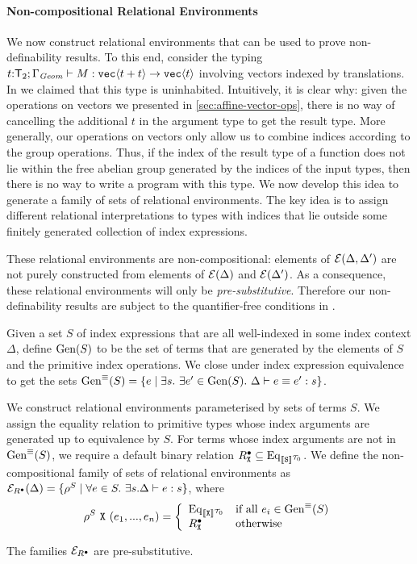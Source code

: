 \paragraph{Non-compositional Relational Environments}
We now construct relational environments that can be used to prove
non-definability results. To this end, consider the typing
$t\mathord:\mathsf{T}_2; \Gamma_{\mathit{Geom}} \vdash M : \textup{\texttt{vec}}\langle t +
  t \rangle \to \textup{\texttt{vec}}\langle t \rangle$ involving vectors indexed by translations.
In  we claimed that this type is
uninhabited. Intuitively, it is clear why: given the operations on
vectors we presented in \autoref{sec:affine-vector-ops}, there is no
way of cancelling the additional $t$ in the argument type to get the
result type. More generally, our operations on vectors only allow us
to combine indices according to the group operations. Thus, if the
index of the result type of a function does not lie within the free
abelian group generated by the indices of the input types, then there
is no way to write a program with this %
type. We now develop this idea to generate a family of sets of
relational environments. The key idea is to assign different
relational interpretations to types with indices that lie outside some
finitely generated collection of index expressions.

These relational environments are non-compositional: elements of
$\mathcal{E}(\Delta,\Delta')$ are not purely constructed from elements
of $\mathcal{E}(\Delta)$ and $\mathcal{E}(\Delta')$. As a consequence,
these relational environments will only be
\emph{pre-substitutive}. Therefore our non-definability results are
subject to the quantifier-free conditions in .

Given a set $S$ of index expressions that are all well-indexed in some
index context $\Delta$, define $\mathrm{Gen}(S)$ to be the set of terms that
are generated by the elements of $S$ and the primitive index
operations. We close under index expression equivalence to get the
sets $\mathrm{Gen}^\equiv(S) = \{ e \mathrel| \exists s.\ \exists e' \in
\mathrm{Gen}(S).\ \Delta \vdash e \equiv e' : s \}$.

We construct relational environments parameterised by sets of terms
$S$. We assign the equality relation to primitive types whose index
arguments are generated up to equivalence by $S$. For terms whose
index arguments are not in $\mathrm{Gen}^\equiv(S)$, we require a default
binary relation $R^\bullet_{\textup{\texttt{X}}} \subseteq
\mathrm{Eq}_{\llbracket \textup{\texttt{S}} \rrbracket^{\mathcal{T}_0}}$. We define the non-compositional
family of sets of relational environments as
$\mathcal{E}_{R^\bullet}(\Delta) = \{ \rho^S \mathrel| \forall e \in S.\
\exists s. \Delta \vdash e : s \}$, where
\begin{displaymath}
  \rho^S\ \textup{\texttt{X}}\ (e_1,...,e_n) = \left\{
    \begin{array}{ll}
      \mathrm{Eq}_{\llbracket \textup{\texttt{X}} \rrbracket^{\mathcal{T}_0}} & \textrm{if all}\ e_i \in \mathrm{Gen}^\equiv(S) \\
      R^\bullet_{\textup{\texttt{X}}} & \textrm{otherwise}
    \end{array}
  \right.
\end{displaymath}

\begin{theorem}
  The families $\mathcal{E}_{R^\bullet}$ are pre-substitutive.
\end{theorem}


